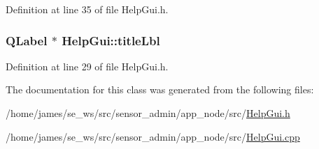 Definition at line 35 of file Help\-Gui.\-h.

\hypertarget{class_help_gui_a68128f3db7b1af2a517eda58f398828f}{
\subsubsection[{title\-Lbl}]{\setlength{\rightskip}{0pt plus 5cm}Q\-Label $\ast$ Help\-Gui\-::title\-Lbl\hspace{0.3cm}{\ttfamily [private]}}}\label{class_help_gui_a68128f3db7b1af2a517eda58f398828f}


Definition at line 29 of file Help\-Gui.\-h.



The documentation for this class was generated from the following files\-:\begin{DoxyCompactItemize}
\item 
/home/james/se\-\_\-ws/src/sensor\-\_\-admin/app\-\_\-node/src/\hyperlink{app__node_2src_2_help_gui_8h}{Help\-Gui.\-h}\item 
/home/james/se\-\_\-ws/src/sensor\-\_\-admin/app\-\_\-node/src/\hyperlink{app__node_2src_2_help_gui_8cpp}{Help\-Gui.\-cpp}\end{DoxyCompactItemize}
